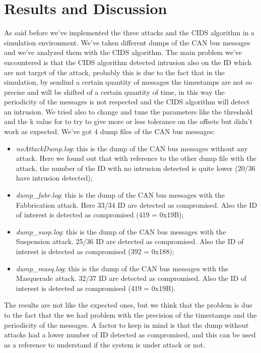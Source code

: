 \documentclass[12pt]{article}
\begin{document}
\section{Results and Discussion}
As said before we've implemented the three attacks and the CIDS algorithm in a simulation environment.
We've taken different dumps of the CAN bus messages and we've analyzed them with the CIDS algorithm. 
The main problem we've encountered is that the CIDS algorithm detected intrusion also on the ID which are not 
target of the attack, probably this is due to the fact that in the simulation, by sendind a certain quantity of messages 
the timestamps are not so precise and will be shifted of a certain quantity of time, in this way the periodicity 
of the messages is not respected and the CIDS algorithm will detect an intrusion. We tried also to 
change and tune the parameters like the threshold and the k value for to try to give more or less tolerance on 
the offsets but didn't work as expected.
We've got 4 dump files of the CAN bus messages:
\begin{itemize}
    \item \textit{noAttackDump.log}: this is the dump of the CAN bus messages without any attack. 
    Here we found out that with reference to the other dump file with the attack, the number of the ID with no intrusion 
    detected is quite lower (20/36 have intrusion detected);
    \item \textit{dump\_fabr.log}: this is the dump of the CAN bus messages with the Fabbrication attack. Here 33/34 ID are 
    detected as compromised. Also the ID of interest is detected as compromised (419 = 0x19B);
    \item \textit{dump\_susp.log}: this is the dump of the CAN bus messages with the Suspension attack. 25/36 ID are detected 
    as compromised. Also the ID of interest is detected as compromised (392 = 0x188);
    \item \textit{dump\_masq.log}: this is the dump of the CAN bus messages with the Masquerade attack. 32/37 ID are detected 
    as compromised. Also the ID of interest is detected as compromised (419 = 0x19B).
\end{itemize}
The results are not like the expected ones, but we think that the problem is due to the fact that the we had problem 
with the precision of the timestamps and the periodicity of the messages. A factor to keep in mind is that the dump without 
attacks had a lower number of ID detected as compromised, and this can be used as a reference to understand if the 
system is under attack or not.
\printbibliography 
\end{document}
